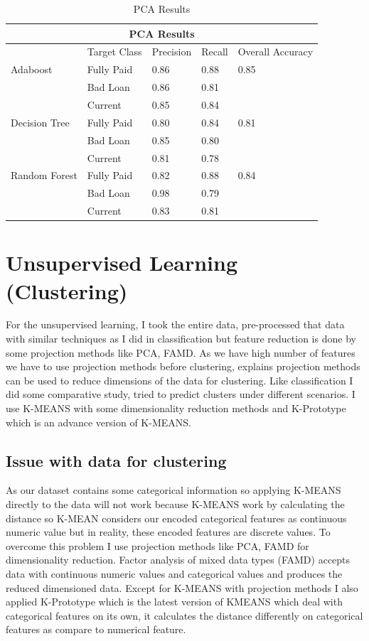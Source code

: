 \documentclass[12pt]{article}
\begin{document}
\begin{table}[h!]
	\centering
	\begin{tabular}{ |p{3cm}||p{2cm}|p{2cm}|p{2cm}|p{2cm}|  }
		\hline
		\multicolumn{5}{|c|}{PCA Results} \\
		\hline
		& Target Class & Precision & Recall & Overall Accuracy \\
		\hline
		Adaboost & Fully Paid &0.86 & 0.88 & 0.85\\
		& Bad Loan & 0.86 & 0.81 & \\
		& Current & 0.85 & 0.84 & \\
		\hline
		Decision Tree & Fully Paid & 0.80 & 0.84 & 0.81\\
		& Bad Loan & 0.85 &  0.80 & \\
		& Current &0.81 &  0.78 & \\
		\hline
		Random Forest & Fully Paid & 0.82 & 0.88 & 0.84\\
		& Bad Loan &0.98  & 0.79 & \\
		& Current & 0.83 & 0.81 & \\
		\hline
	\end{tabular}
	\caption{PCA Results}
	\label{table:pca_results}
\end{table}

\section{Unsupervised Learning (Clustering)}
For the unsupervised learning, I took the entire data, pre-processed that data with similar techniques as I did in classification but feature reduction is done by some projection methods like PCA, FAMD. As we have high number of features we have to use projection methods before clustering, \citep{DRK} explains projection methods can be used to reduce dimensions of the data for clustering. Like classification I did some comparative study, tried to predict clusters under different scenarios. I use K-MEANS with some dimensionality reduction methods and K-Prototype which is an advance version of K-MEANS.
\subsection{Issue with data for clustering}
As our dataset contains some categorical information so applying K-MEANS directly to the data will not work because K-MEANS work by calculating the distance so K-MEAN considers our encoded categorical features as continuous numeric value but in reality, these encoded features are discrete values. To overcome this problem I use projection methods like PCA, FAMD for dimensionality reduction. Factor analysis of mixed data types (FAMD) accepts data with continuous numeric values and categorical values and produces the reduced dimensioned data. Except for K-MEANS with projection methods I also applied K-Prototype which is the latest version of KMEANS which deal with categorical features on its own, it calculates the distance differently on categorical features as compare to numerical feature.
\end{document}
